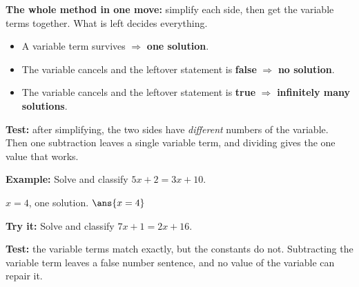 \documentclass[12pt]{article}
\begin{document}

\begin{formulabox}
\textbf{The whole method in one move:} simplify each side, then get the
variable terms together. What is left decides everything.\par
\begin{itemize}[leftmargin=0.9cm, itemsep=1pt, topsep=2pt]
  \item A variable term survives $\Rightarrow$ \textbf{one solution}.
  \item The variable cancels and the leftover statement is \textbf{false}
        $\Rightarrow$ \textbf{no solution}.
  \item The variable cancels and the leftover statement is \textbf{true}
        $\Rightarrow$ \textbf{infinitely many solutions}.
\end{itemize}
\end{formulabox}


\begin{formulabox}
\textbf{Test:} after simplifying, the two sides have \emph{different} numbers
of the variable. Then one subtraction leaves a single variable term, and
dividing gives the one value that works.
\end{formulabox}

\begin{examplebox}
\textbf{Example:} \quad Solve and classify $5x + 2 = 3x + 10$.

$x = 4$, one solution. \quad $\ans{x = 4}$
\end{examplebox}

\begin{tryitbox}
\textbf{Try it:} \quad Solve and classify $7x + 1 = 2x + 16$.\\[2pt]
\end{tryitbox}


\begin{formulabox}
\textbf{Test:} the variable terms match exactly, but the constants do not.
Subtracting the variable term leaves a false number sentence, and no value of
the variable can repair it.
\end{formulabox}
\end{document}
